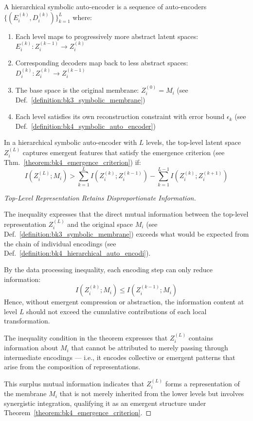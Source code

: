 \begin{definition} \label{definition:bk4_hierarchical_auto_encodi}
A hierarchical symbolic auto-encoder is a sequence of auto-encoders $\{(E_i^{(k)}, D_i^{(k)})\}_{k=1}^{L}$ where:
\begin{enumerate}
    \item Each level maps to progressively more abstract latent spaces: $E_i^{(k)}: Z_i^{(k-1)} \to Z_i^{(k)}$
    \item Corresponding decoders map back to less abstract spaces: $D_i^{(k)}: Z_i^{(k)} \to Z_i^{(k-1)}$
    \item The base space is the original membrane: $Z_i^{(0)} = M_i$ (see Def.~\ref{definition:bk3_symbolic_membrane})
    \item Each level satisfies its own reconstruction constraint with error bound $\epsilon_k$ (see Def.~\ref{definition:bk4_symbolic_auto_encoder})
\end{enumerate}
\end{definition}
\begin{theorem} \label{theorem:bk4_emergent_abstraction}
In a hierarchical symbolic auto-encoder with $L$ levels, the top-level latent space $Z_i^{(L)}$ captures emergent features that satisfy the emergence criterion (see Thm.~\ref{theorem:bk4_emergence_criterion}) if:
\begin{equation}
    I(Z_i^{(L)}; M_i) > \sum_{k=1}^{L} I(Z_i^{(k)}; Z_i^{(k-1)}) - \sum_{k=1}^{L-1} I(Z_i^{(k)}; Z_i^{(k+1)})
\end{equation}
\end{theorem}

\begin{proof}[Top-Level Representation Retains Disproportionate Information]
\label{proof:bk4_top_level_information_inequality}
\leavevmode

The inequality expresses that the direct mutual information between the top-level representation $Z_i^{(L)}$ and the original space $M_i$ (see Def.~\ref{definition:bk3_symbolic_membrane}) exceeds what would be expected from the chain of individual encodings (see Def.~\ref{definition:bk4_hierarchical_auto_encodi}).

By the data processing inequality, each encoding step can only reduce information:
\begin{equation}
    I(Z_i^{(k)}; M_i) \leq I(Z_i^{(k-1)}; M_i)
\end{equation}
Hence, without emergent compression or abstraction, the information content at level $L$ should not exceed the cumulative contributions of each local transformation.

The inequality condition in the theorem expresses that $Z_i^{(L)}$ contains information about $M_i$ that cannot be attributed to merely passing through intermediate encodings --- i.e., it encodes collective or emergent patterns that arise from the composition of representations.

This surplus mutual information indicates that $Z_i^{(L)}$ forms a representation of the membrane $M_i$ that is not merely inherited from the lower levels but involves synergistic integration, qualifying it as an emergent structure under Theorem~\ref{theorem:bk4_emergence_criterion}.
\end{proof}
